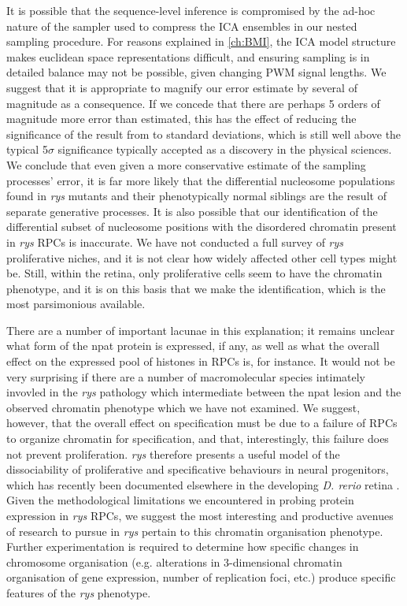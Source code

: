 It is possible that the sequence-level inference is compromised by the ad-hoc nature of the sampler used to compress the ICA ensembles in our nested sampling procedure. For reasons explained in \autoref{ch:BMI}, the ICA model structure makes euclidean space representations difficult, and ensuring sampling is in detailed balance may not be possible, given changing PWM signal lengths. We suggest that it is appropriate to magnify our error estimate by several of magnitude as a consequence. If we concede that there are perhaps 5 orders of magnitude more error than estimated, this has the effect of reducing the significance of the result from to standard deviations, which is still well above the typical 5$\sigma$ significance typically accepted as a discovery in the physical sciences. We conclude that even given a more conservative estimate of the sampling processes' error, it is far more likely that the differential nucleosome populations found in \textit{rys} mutants and their phenotypically normal siblings are the result of separate generative processes. It is also possible that our identification of the differential subset of nucleosome positions with the disordered chromatin present in \textit{rys} RPCs is inaccurate. We have not conducted a full survey of \textit{rys} proliferative niches, and it is not clear how widely affected other cell types might be. Still, within the retina, only proliferative cells seem to have the chromatin phenotype, and it is on this basis that we make the identification, which is the most parsimonious available. 

There are a number of important lacunae in this explanation; it remains unclear what form of the npat protein is expressed, if any, as well as what the overall effect on the expressed pool of histones in RPCs is, for instance. It would not be very surprising if there are a number of macromolecular species intimately invovled in the \textit{rys} pathology which intermediate between the npat lesion and the observed chromatin phenotype which we have not examined. We suggest, however, that the overall effect on specification must be due to a failure of RPCs to organize chromatin for specification, and that, interestingly, this failure does not prevent proliferation. \textit{rys} therefore presents a useful model of the dissociability of proliferative and specificative behaviours in neural progenitors, which has recently been documented elsewhere in the developing \textit{D. rerio} retina \cite{Engerer2017}. Given the methodological limitations we encountered in probing protein expression in \textit{rys} RPCs, we suggest the most interesting and productive avenues of research to pursue in \textit{rys} pertain to this chromatin organisation phenotype.  Further experimentation is required to determine how specific changes in chromosome organisation (e.g. alterations in 3-dimensional chromatin organisation of gene expression, number of replication foci, etc.) produce specific features of the \textit{rys} phenotype. 

